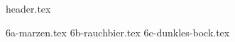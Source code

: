\clearpage
{}
\divisorLine
{header.tex}
\begin{multicols*}{2}
{6a-marzen.tex}
{6b-rauchbier.tex}
{6c-dunkles-bock.tex}
\end{multicols*}